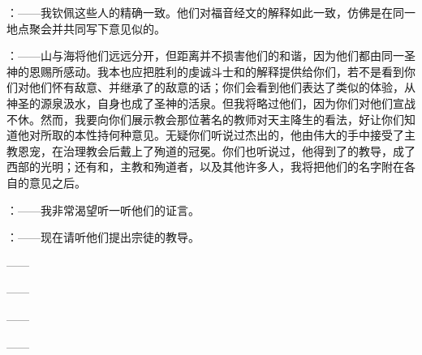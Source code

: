 ：——我钦佩这些人的精确一致。他们对福音经文的解释如此一致，仿佛是在同一地点聚会并共同写下意见似的。\par

：——山与海将他们远远分开，但距离并不损害他们的和谐，因为他们都由同一圣神的恩赐所感动。我本也应把胜利的虔诚斗士和的解释提供给你们，若不是看到你们对他们怀有敌意、并继承了的敌意的话；你们会看到他们表达了类似的体验，从神圣的源泉汲水，自身也成了圣神的活泉。但我将略过他们，因为你们对他们宣战不休。然而，我要向你们展示教会那位著名的教师对天主降生的看法，好让你们知道他对所取的本性持何种意见。无疑你们听说过杰出的，他由伟大的手中接受了主教恩宠，在治理教会后戴上了殉道的冠冕。你们也听说过，他得到了的教导，成了西部的光明；还有和，主教和殉道者，以及其他许多人，我将把他们的名字附在各自的意见之后。\par

：——我非常渴望听一听他们的证言。\par

：——现在请听他们提出宗徒的教导。\par

——\par

\par

——\par

\par

——\par

\par

——\par


